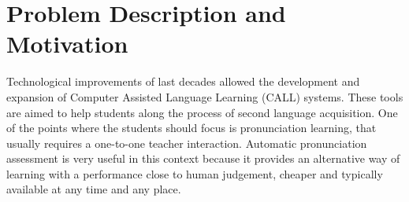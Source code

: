 
\section{Problem Description and Motivation} \label{section:motivation}

Technological improvements of last decades allowed the development and expansion of Computer
Assisted Language Learning (CALL) systems. These tools are aimed to help students along the
process of second language acquisition. One of the points where the
students should focus is pronunciation learning, that usually requires a one-to-one teacher
interaction. Automatic pronunciation assessment is very useful in this
context because it provides an alternative way of learning with a performance close to human judgement,
cheaper and typically available at any time and any place.




